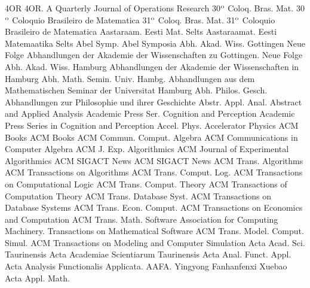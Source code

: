 {4OR}
{4OR. A Quarterly Journal of Operations Research}
{30$\sp {\rm o}$ Coloq. Bras. Mat.}
{30$\sp {\rm o}$ Coloquio Brasileiro de Matematica}
{31$\sp {\rm o}$ Coloq. Bras. Mat.}
{31$\sp {\rm o}$ Coloquio Brasileiro de Matematica}
{Aastaraam. Eesti Mat. Selts}
{Aastaraamat. Eesti Matemaatika Selts}
{Abel Symp.}
{Abel Symposia}
{Abh. Akad. Wiss. Gottingen Neue Folge}
{Abhandlungen der Akademie der Wissenschaften zu Gottingen. Neue Folge}
{Abh. Akad. Wiss. Hamburg}
{Abhandlungen der Akademie der Wissenschaften in Hamburg}
{Abh. Math. Semin. Univ. Hambg.}
{Abhandlungen aus dem Mathematischen Seminar der Universitat Hamburg}
{Abh. Philos. Gesch.}
{Abhandlungen zur Philosophie und ihrer Geschichte}
{Abstr. Appl. Anal.}
{Abstract and Applied Analysis}
{Academic Press Ser. Cognition and Perception}
{Academic Press Series in Cognition and Perception}
{Accel. Phys.}
{Accelerator Physics}
{ACM Books}
{ACM Books}
{ACM Commun. Comput. Algebra}
{ACM Communications in Computer Algebra}
{ACM J. Exp. Algorithmics}
{ACM Journal of Experimental Algorithmics}
{ACM SIGACT News}
{ACM SIGACT News}
{ACM Trans. Algorithms}
{ACM Transactions on Algorithms}
{ACM Trans. Comput. Log.}
{ACM Transactions on Computational Logic}
{ACM Trans. Comput. Theory}
{ACM Transactions of Computation Theory}
{ACM Trans. Database Syst.}
{ACM Transactions on Database Systems}
{ACM Trans. Econ. Comput.}
{ACM Transactions on Economics and Computation}
{ACM Trans. Math. Software}
{Association for Computing Machinery. Transactions on Mathematical Software}
{ACM Trans. Model. Comput. Simul.}
{ACM Transactions on Modeling and Computer Simulation}
{Acta Acad. Sci. Taurinensis}
{Acta Academiae Scientiarum Taurinensis}
{Acta Anal. Funct. Appl.}
{Acta Analysis Functionalis Applicata. AAFA. Yingyong Fanhanfenxi Xuebao}
{Acta Appl. Math.}
